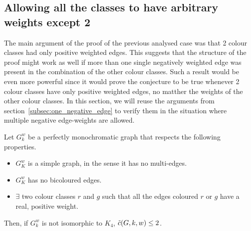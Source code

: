 \subsection{Allowing all the classes to have arbitrary weights except 2}
\label{subsec:2-pos-classes}

The main argument of the proof of the previous analysed case was that 2 colour classes had only positive weighted edges.
This suggests that the structure of the proof might work as well if more than one single negatively weighted edge was present in the combination of the other colour classes.
Such a result would be even more powerful since it would prove the conjecture to be true whenever 2 colour classes have only positive weighted edges, no matther the weights of the other colour classes.
In this section, we will reuse the arguments from section~\ref{subsec:one_negative_edge} to verify them in the situation where multiple negative edge-weights are allowed.


\begin{lemma}
    \label{lem:2_positive_colour_classes_forbidden}
    Let $G_k^w$ be a perfectly monochromatic graph that respects the following properties.
    \begin{itemize}
        \item $G_K^w$ is a simple graph, in the sense it has no multi-edges.
        \item $G_K^w$ has no bicoloured edges.
        \item $\exists$ two colour classes $r$ and $g$ such that all the edges coloured $r$ or $g$ have a real, positive weight.
    \end{itemize}
    Then, if $G_k^w$ is not isomorphic to $K_4$, $\Tilde{c}(G, k, w) \leq 2$.
\end{lemma}

